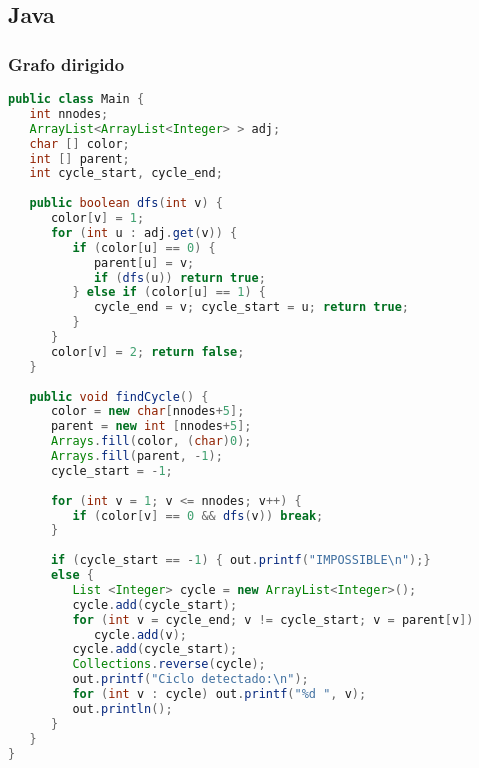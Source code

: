 \subsection{Java}

\subsubsection{Grafo dirigido}
\begin{lstlisting}[language=Java]
public class Main {
   int nnodes;
   ArrayList<ArrayList<Integer> > adj;
   char [] color;
   int [] parent;
   int cycle_start, cycle_end;
	
   public boolean dfs(int v) {
      color[v] = 1;
      for (int u : adj.get(v)) {
         if (color[u] == 0) {
            parent[u] = v;
            if (dfs(u)) return true;
         } else if (color[u] == 1) {
            cycle_end = v; cycle_start = u; return true;
         }
      }
      color[v] = 2; return false;
   }
	
   public void findCycle() {
      color = new char[nnodes+5];
      parent = new int [nnodes+5];
      Arrays.fill(color, (char)0);
      Arrays.fill(parent, -1);
      cycle_start = -1;
		
      for (int v = 1; v <= nnodes; v++) {
         if (color[v] == 0 && dfs(v)) break;
      }
		
      if (cycle_start == -1) { out.printf("IMPOSSIBLE\n");} 
      else {
         List <Integer> cycle = new ArrayList<Integer>();
         cycle.add(cycle_start);
         for (int v = cycle_end; v != cycle_start; v = parent[v])
            cycle.add(v); 
         cycle.add(cycle_start);
         Collections.reverse(cycle); 
         out.printf("Ciclo detectado:\n");
         for (int v : cycle) out.printf("%d ", v);
         out.println();
      }
   }
}
\end{lstlisting}


